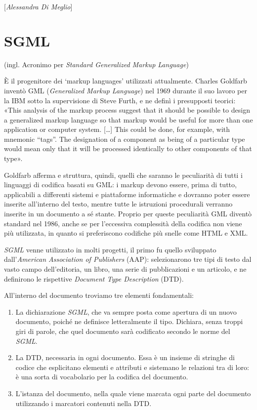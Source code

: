 \hrulefill 
 
{[}\emph{Alessandra Di Meglio}{]}




\chapter{SGML}

(ingl. Acronimo per \emph{Standard Generalized Markup Language})

È il progenitore dei `markup languages' utilizzati attualmente. Charles
Goldfarb inventò GML (\emph{Generalized Markup Language}) nel 1969
durante il suo lavoro per la IBM sotto la supervisione di Steve Furth, e
ne definì i presupposti teorici: «This analysis of the markup process
suggest that it should be possible to design a generalized markup
language so that markup would be useful for more than one application or
computer system. {[}\ldots{}{]} This could be done, for example, with
mnemonic ``tags''. The designation of a component as being of a
particular type would mean only that it will be processed identically to
other components of that type».

Goldfarb afferma e struttura, quindi, quelli che saranno le peculiarità
di tutti i linguaggi di codifica basati su GML: i markup devono essere,
prima di tutto, applicabili a differenti sistemi e piattaforme
informatiche e dovranno poter essere inserite all'interno del testo,
mentre tutte le istruzioni procedurali verranno inserite in un documento
a sé stante. Proprio per queste peculiarità GML diventò standard nel
1986, anche se per l'eccessiva complessità della codifica non viene più
utilizzata, in quanto si preferiscono codifiche più snelle come HTML e
XML.

\emph{SGML} venne utilizzato in molti progetti, il primo fu quello
sviluppato dall'\emph{American Association of Publishers} (AAP):
selezionarono tre tipi di testo dal vasto campo dell'editoria, un libro,
una serie di pubblicazioni e un articolo, e ne definirono le rispettive
\emph{Document Type Description} (DTD).

All'interno del documento troviamo tre elementi fondamentali:

\begin{enumerate}
\def\labelenumi{\arabic{enumi}.}
\item
  La dichiarazione \emph{SGML}, che va sempre posta come apertura di un
  nuovo documento, poiché ne definisce letteralmente il tipo. Dichiara,
  senza troppi giri di parole, che quel documento sarà codificato
  secondo le norme del \emph{SGML}.
\item
  La DTD, necessaria in ogni documento. Essa è un insieme di stringhe di
  codice che esplicitano elementi e attributi e sistemano le relazioni
  tra di loro: è una sorta di vocabolario per la codifica del documento.
\item
  L'istanza del documento, nella quale viene marcata ogni parte del
  documento utilizzando i marcatori contenuti nella DTD.
\end{enumerate}

